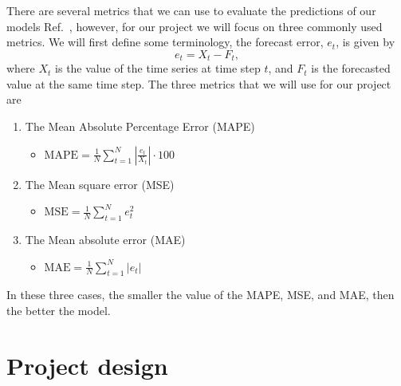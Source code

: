 \documentclass[10pt,a4paper]{article}
\begin{document}
There are several metrics that we can use to evaluate the predictions of our models Ref.~\cite{Adhikari_2013}, however, for our project we will focus on three commonly used metrics. We will first define some terminology, the forecast error, $e_t$, is given by
\begin{equation}
e_{t} = X_t - F_t,
\end{equation}
where $X_t$ is the value of the time series at time step $t$, and $F_t$ is the forecasted value at the same time step. The three metrics that we will use for our project are
\begin{enumerate}
\item  The Mean Absolute Percentage Error (MAPE)
\begin{itemize}
\item $\text{MAPE} = \frac{1}{N}\sum\limits_{t=1}^{N} \left| \frac{e_{t}}{X_t} \right| \cdot 100 $
\end{itemize}

\item  The Mean square error (MSE)
\begin{itemize}
\item $\text{MSE} = \frac{1}{N}\sum\limits_{t=1}^{N} e^2_{t} $
\end{itemize}

\item  The Mean absolute error (MAE)
\begin{itemize}
\item $\text{MAE} = \frac{1}{N}\sum\limits_{t=1}^{N} |e_{t}| $
\end{itemize}

\end{enumerate}
\noindent
In these three cases, the smaller the value of the MAPE, MSE, and MAE, then the better the model.



\section{Project design}

\end{document}
